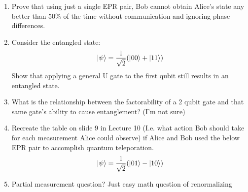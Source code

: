 \documentclass[12pt]{article}
\begin{document}
\begin{enumerate}[font=\bfseries]
\begin{enumerate}
    \end{enumerate}
    \item Prove that using just a single EPR pair, Bob cannot obtain Alice's state any better than 50\% of the time without communication and ignoring phase differences.
    \item Consider the entangled state: 
    \[\ket{\psi} = \frac{1}{\sqrt{2}}(\ket{00}+\ket{11})\]
    Show that applying a general U gate to the first qubit still results in an entangled state.
    \item What is the relationship between the factorability of a 2 qubit gate and that same gate's ability to cause entanglement? (I'm not sure)
    \item Recreate the table on slide 9 in Lecture 10 (I.e. what action Bob should take for each measurement Alice could observe) if Alice and Bob used the below EPR pair to accomplish quantum teleporation.
    \[\ket{\psi} = \frac{1}{\sqrt{2}}(\ket{01}-\ket{10})\]
    \item Partial measurement question? Just easy math question of renormalizing
    
\end{enumerate}
\end{document}
